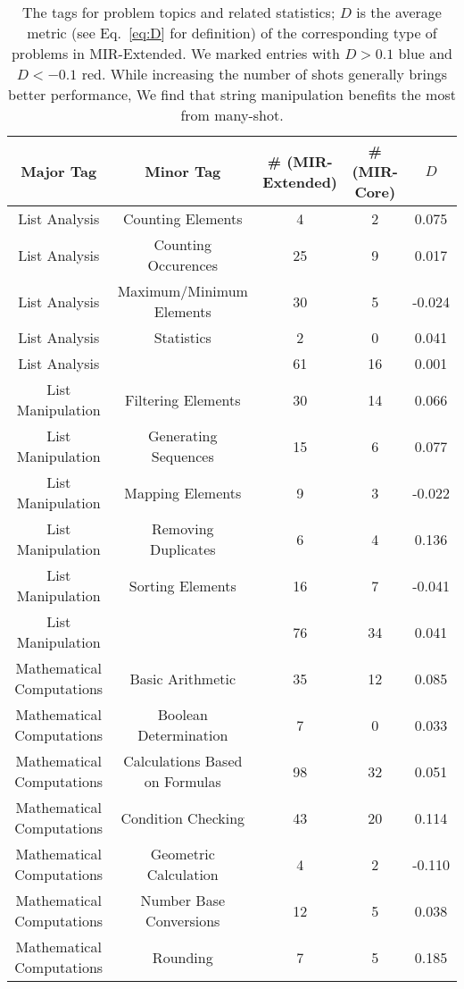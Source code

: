 \begin{table*}[ht]
    \centering
    \small
    \caption{The tags for problem topics and related statistics; $D$ is the average metric (see Eq.~\eqref{eq:D} for definition) of the corresponding type of problems in MIR-Extended. We marked entries with $D>0.1$ {\color{blue}blue} and $D<-0.1$ {\color{red}red.} While increasing the number of shots generally brings better performance, We find that string manipulation benefits the most from many-shot.}
    \begin{tabular}{ccccc}
       \toprule
        Major Tag & Minor Tag & \# (MIR-Extended) & \# (MIR-Core) & $D$ \\ 
        \midrule
        List Analysis & Counting Elements & 4&2& 0.075 \\
        List Analysis & Counting Occurences &25&9& 0.017 \\
        List Analysis & Maximum/Minimum Elements &30&5& -0.024 \\
        List Analysis & Statistics &2& 0& 0.041 \\
        List Analysis &&61&16& 0.001 \\
        \midrule
        List Manipulation & Filtering Elements &30&14& 0.066 \\
        List Manipulation & Generating Sequences &15&6& 0.077\\
        List Manipulation & Mapping Elements &9&3& -0.022 \\
        List Manipulation & Removing Duplicates &6&4& {\color{blue}0.136} \\
        List Manipulation & Sorting Elements &16&7& -0.041 \\
        List Manipulation &&76&34&0.041  \\
        \midrule
        Mathematical Computations & Basic Arithmetic & 35 &12& 0.085 \\
        Mathematical Computations & Boolean Determination & 7&0& 0.033 \\
        Mathematical Computations & Calculations Based on Formulas & 98 &32& 0.051 \\
        Mathematical Computations & Condition Checking & 43&20& {\color{blue}0.114} \\
        Mathematical Computations & Geometric Calculation &4&2& {\color{red}-0.110}\\
        Mathematical Computations & Number Base Conversions &12&5& 0.038\\
        Mathematical Computations & Rounding &7&5& {\color{blue}0.185}\\

\end{tabular}
\end{table*}

